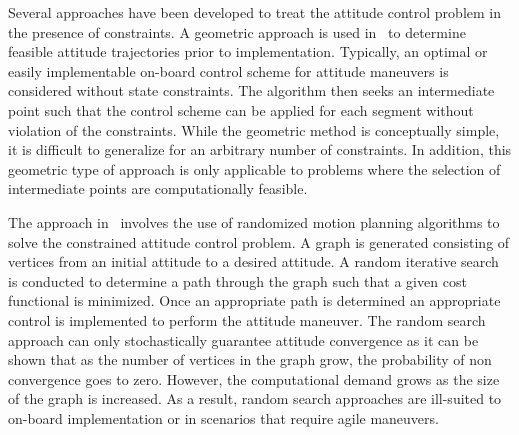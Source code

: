 \documentclass[letterpaper, 10 pt, conference]{ieeeconf}  %
\begin{document}
Several approaches have been developed to treat the attitude control problem in the presence of constraints.
A geometric approach is used in~\cite{hablani1999} to determine feasible attitude trajectories prior to implementation.
Typically, an optimal or easily implementable on-board control scheme for attitude maneuvers is considered without state constraints.
The algorithm then seeks an intermediate point such that the control scheme can be applied for each segment without violation of the constraints.
While the geometric method is conceptually simple, it is difficult to generalize for an arbitrary number of constraints.
In addition, this geometric type of approach is only applicable to problems where the selection of intermediate points are computationally feasible.

The approach in~\cite{frazzoli2001} involves the use of randomized motion planning algorithms to solve the constrained attitude control problem.
A graph is generated consisting of vertices from an initial attitude to a desired attitude. 
A random iterative search is conducted to determine a path through the graph such that a given cost functional is minimized.
Once an appropriate path is determined an appropriate control is implemented to perform the attitude maneuver.
The random search approach can only stochastically guarantee attitude convergence as it can be shown that as the number of vertices in the graph grow, the probability of non convergence goes to zero.
However, the computational demand grows as the size of the graph is increased. 
As a result, random search approaches are ill-suited to on-board implementation or in scenarios that require agile maneuvers.

\end{document}

